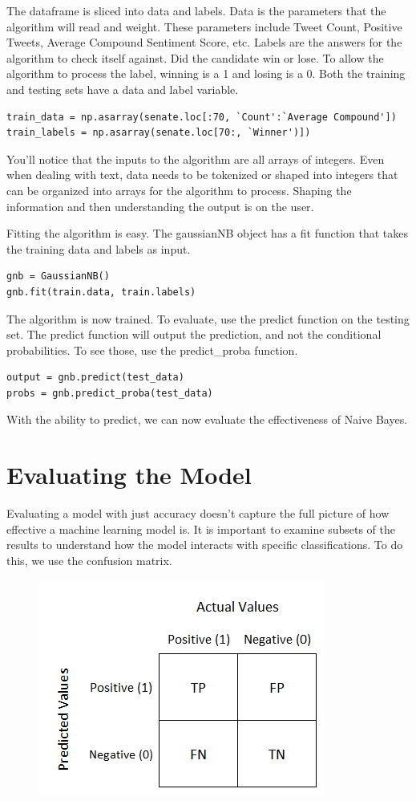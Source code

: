 \documentclass[11pt, twoside, reqno]{article}
\begin{document}
The dataframe is sliced into data and labels. Data is the parameters that the algorithm will read and weight. These parameters include Tweet Count, Positive Tweets, Average Compound Sentiment Score, etc. Labels are the answers for the algorithm to check itself against. Did the candidate win or lose. To allow the algorithm to process the label, winning is a 1 and losing is a 0. Both the training and testing sets have a data and label variable. 
\begin{verbatim}
train_data = np.asarray(senate.loc[:70, `Count':`Average Compound'])
train_labels = np.asarray(senate.loc[70:, `Winner')])
\end{verbatim}
You'll notice that the inputs to the algorithm are all arrays of integers. Even when dealing with text, data needs to be tokenized or shaped into integers that can be organized into arrays for the algorithm to process. Shaping the information and then understanding the output is on the user. 

Fitting the algorithm is easy. The gaussianNB object has a fit function that takes the training data and labels as input.
\begin{verbatim}
gnb = GaussianNB()
gnb.fit(train.data, train.labels)
\end{verbatim}

The algorithm is now trained. To evaluate, use the predict function on the testing set. The predict function will output the prediction, and not the conditional probabilities. To see those, use the predict\_proba function. 
\begin{verbatim}
output = gnb.predict(test_data)
probs = gnb.predict_proba(test_data)
\end{verbatim}
With the ability to predict, we can now evaluate the effectiveness of Naive Bayes. 
 
\section{Evaluating the Model}
\hspace{0.2in} Evaluating a model with just accuracy doesn't capture the full picture of how effective a machine learning model is. It is important to examine subsets of the results to understand how the model interacts with specific classifications. To do this, we use the confusion matrix. 

\begin{figure}[H]
\label{fig:confmatrix}
\centering
	\includegraphics[scale=0.5]{confusion_matrix}
\end{figure}
\end{document}
